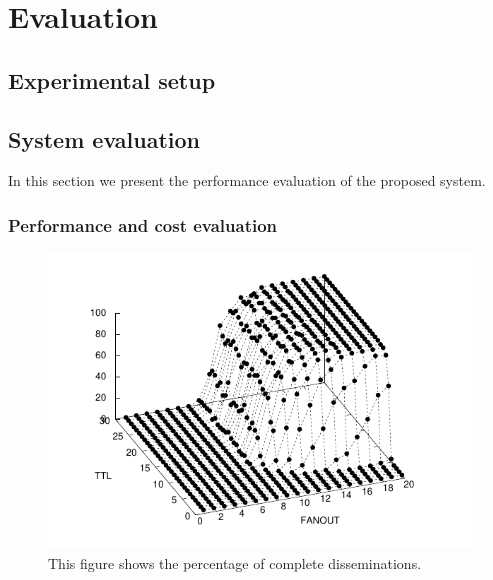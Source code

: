 %
\chapter{Evaluation}
\label{sec:evaluation}

\Blindtext[2][1]

\section{Experimental setup}

\Blindtext[2][1]



\section{System evaluation}

In this section we present the performance evaluation of the proposed system.

\subsection{Performance and cost evaluation}
\label{sec:perf}



\begin{figure}[h]
  \centering
  \includegraphics{figs/complete.pdf}
  \caption{This figure shows the percentage of complete disseminations.}
  \label{fig:complete}
\end{figure}

\Blindtext[2][1]

